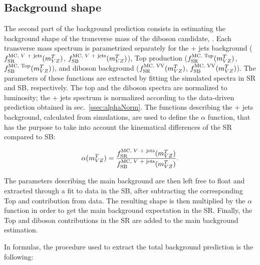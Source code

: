 



\subsection{Background shape}\label{ssec:alphaShape}

The second part of the background prediction consists in estimating the background shape of the transverse mass of the diboson candidate, \mtVZ. Each transverse mass spectrum is parametrized separately for the \V + jets background ($f_{\text{SR}}^{\text{MC, \V + jets}}(\mtVZ)$, $f_{\text{SB}}^{\text{MC, \V + jets}}(\mtVZ)$), Top production ($f_{\text{SR}}^{\text{MC, Top}}(m_{VZ}^T)$, $f_{\text{SB}}^{\text{MC, Top}}(m_{VZ}^T)$), and diboson background ($f_{\text{SR}}^{\text{MC, VV}}(m_{VZ}^T)$, $f_{\text{SB}}^{\text{MC, VV}}(m_{VZ}^T)$). The parameters of these functions are extracted by fitting the simulated \mtVZ spectra in SR and SB, respectively. The top and the diboson spectra are normalized to luminosity; the \V + jets spectrum is normalized according to the data-driven prediction obtained in sec.~\ref{ssec:alphaNorm}. The functions describing the \V + jets background, calculated from simulations, are used to define the $\alpha$ function, that has the purpose to take into account the kinematical differences of the SR compared to SB:

\begin{equation}
\alpha(\mtVZ) = \frac{f_{\text{SR}}^{\text{MC, \V + jets}}(\mtVZ)}{f_{\text{SB}}^{\text{MC, \V + jets}}(\mtVZ)}.
\end{equation}

\noindent The parameters describing the main background are then left free to float and extracted through a fit to data in the SB, after subtracting the corresponding Top and \VV contribution from data. The resulting shape is then multiplied by the $\alpha$ function in order to get the main background expectation in the SR. Finally, the Top and diboson contributions in the SR are added to the main background estimation.

\noindent In formulas, the procedure used to extract the total background prediction is the following:



